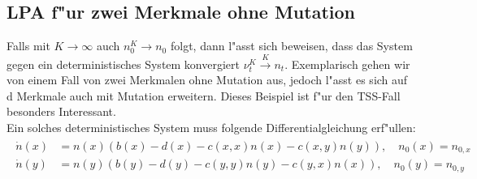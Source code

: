 \documentclass[11pt, a4paper, german]{article}
\theoremstyle{plain}
\begin{document}
	\subsection{LPA f"ur zwei Merkmale ohne Mutation}
	Falls mit $ K \to \infty $ auch $ n_0^K \to n_0 $ folgt, dann l"asst sich beweisen, dass das System gegen ein deterministisches System konvergiert $ \nu_t^K \xrightarrow{K} n_t $. Exemplarisch gehen wir von einem Fall von zwei Merkmalen ohne Mutation aus, jedoch l"asst es sich auf d Merkmale auch mit Mutation erweitern. Dieses Beispiel ist f"ur den TSS-Fall besonders Interessant.\\
	Ein solches deterministisches System muss folgende Differentialgleichung erf"ullen:
	\begin{align}
	\begin{split}
		\dot{n}(x) &= n(x) \left( b(x) - d(x) - c(x,x) n(x) - c(x,y) n(y) \right), \quad n_0(x) = n_{0,x}\\
		\dot{n}(y) &= n(y) \left( b(y) - d(y) - c(y,y) n(y) - c(y,x) n(x) \right), \quad n_0(y) = n_{0,y} \label{Differentialgleichung}
	\end{split}
	\end{align}
	
\end{document}

